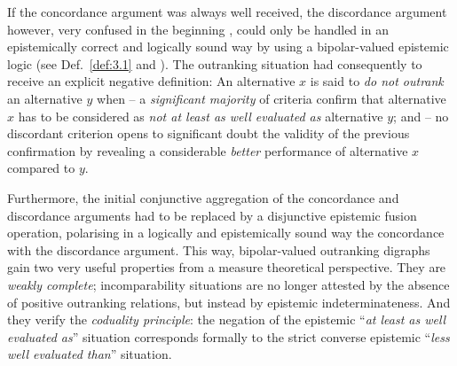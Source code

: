 If the concordance argument was always well received, the discordance argument however, very confused in the beginning \citep{ROY-1966}, could only be handled in an epistemically correct and logically sound way by using a bipolar-valued epistemic logic (see Def.~\vref{def:3.1} and \citealp{BIS-2013}). The outranking situation had consequently to receive an explicit negative definition: An alternative $x$ is said to \emph{do not outrank} an alternative $y$ when – a \emph{significant majority} of criteria confirm that alternative $x$ has to be considered as \emph{not at least as well evaluated as} alternative $y$; and – no discordant criterion opens to significant doubt the validity of the previous confirmation by revealing a considerable \emph{better} performance of alternative $x$ compared to $y$.

Furthermore, the initial conjunctive aggregation of the concordance and discordance arguments had to be replaced by a disjunctive epistemic fusion operation, polarising in a logically and epistemically sound way the concordance with the discordance argument. This way, bipolar-valued outranking  digraphs gain two very useful properties from a measure theoretical perspective. They are \emph{weakly complete}; incomparability situations are no longer attested by the absence of positive outranking relations, but instead by epistemic indeterminateness. And they verify the \emph{coduality principle}: the negation of the epistemic ``\emph{at least as well evaluated as}'' situation corresponds formally to the strict converse epistemic ``\emph{less well evaluated than}'' situation.


\clearpage
% 


